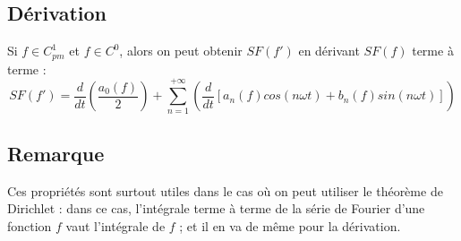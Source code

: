 \documentclass[12pt, a4paper]{article}
\begin{document}
\subsection{Dérivation}

\begin{tcolorbox}
	Si $f \in C_{pm}^1$ et $f \in C^0$, alors on peut obtenir $SF(f')$ en dérivant $SF(f)$ terme à terme :
	\begin{equation*}
		SF(f') = \frac{d}{dt}\left(\frac{a_0(f)}{2}\right) + \sum_{n = 1}^{+\infty}\left(\frac{d}{dt}\left[a_n(f)cos(n\omega t) + b_n(f)sin(n\omega t)\right]\right)
	\end{equation*}
\end{tcolorbox}

\subsection{Remarque}

Ces propriétés sont surtout utiles dans le cas où on peut utiliser le théorème de Dirichlet : dans ce cas, l'intégrale terme à terme de la série de Fourier d'une fonction $f$ vaut l'intégrale de $f$ ; et il en va de même pour la dérivation.
\end{document}
